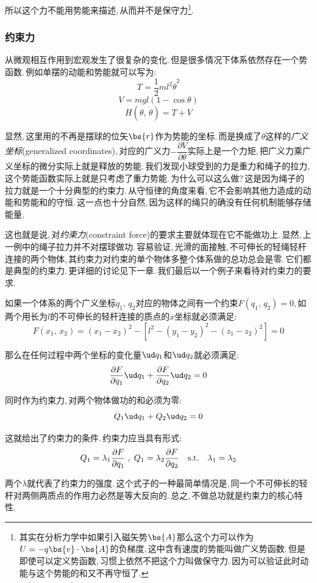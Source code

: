 所以这个力不能用势能来描述,\,从而并不是保守力\footnote{其实在分析力学中如果引入磁矢势$\bs{A}$那么这个力可以作为$U=-q\bs{v}\cdot \bs{A}$的负梯度,\,这中含有速度的势能叫做广义势函数.\,但是即使可以定义势函数,\,习惯上依然不把这个力叫做保守力.\,因为可以验证此时动能与这个势能的和又不再守恒了.}.


\subsubsection{约束力}

从微观相互作用到宏观发生了很复杂的变化.\,但是很多情况下体系依然存在一个势函数.\,例如单摆的动能和势能就可以写为:
\[T=\frac{1}{2}ml^2\dot{\theta}^2\]
\[V=mgl(1-\cos\theta)\]
\[H(\theta,\,\dot{\theta})=T+V\]

显然,\,这里用的不再是摆球的位矢$\bs{r}$作为势能的坐标.\,而是换成了$\theta$这样的\emph{广义坐标}(generalized coordinates),\,对应的广义力$-\dfrac{\partial V}{\partial \theta}$实际上是一个力矩,\,把广义力乘广义坐标的微分实际上就是释放的势能.\,我们发现小球受到的力是重力和绳子的拉力,\,这个势能函数实际上就是只考虑了重力势能.\,为什么可以这么做?\,这是因为绳子的拉力就是一个十分典型的约束力.\,从守恒律的角度来看,\,它不会影响其他力造成的动能和势能和的守恒.\,这一点也十分自然,\,因为这样的绳只的确没有任何机制能够存储能量.

这也就是说,\,对\emph{约束力}(constraint force)的要求主要就体现在它不能做功上.\,显然,\,上一例中的绳子拉力并不对摆球做功.\,容易验证,\,光滑的面接触,\,不可伸长的轻绳轻杆连接的两个物体,\,其约束力对约束的单个物体多整个体系做的总功总会是零.\,它们都是典型的约束力.\,更详细的讨论见下一章.\,我们最后以一个例子来看待对约束力的要求.

如果一个体系的两个广义坐标$q_1,\,q_2$对应的物体之间有一个约束$F(q_1,\,q_2)=0$,\,如两个用长为$l$的不可伸长的轻杆连接的质点的$x$坐标就必须满足:
\[F(x_1,\,x_2)=(x_1-x_2)^2-[l^2-(y_1-y_2)^2-(z_1-z_2)^2]=0\]

那么在任何过程中两个坐标的变化量$\ud q_1$和$\ud q_2$就必须满足:
\[\frac{\partial F}{\partial q_1}\ud q_1+\frac{\partial F}{\partial q_2}\ud q_2=0\]

同时作为约束力,\,对两个物体做功的和必须为零:
\[Q_1\ud q_1+Q_2\ud q_2=0\]

这就给出了约束力的条件.\,约束力应当具有形式:
\[Q_1=\lambda_1\frac{\partial F}{\partial q_1}\; ,\; Q_1=\lambda_2\frac{\partial F}{\partial q_2}\quad {\rm s.t.}\quad \lambda_1=\lambda_2\]

两个$\lambda$就代表了约束力的强度.\,这个式子的一种最简单情况是,\,同一个不可伸长的轻杆对两侧两质点的作用力必然是等大反向的.\,总之,\,不做总功就是约束力的核心特性.

